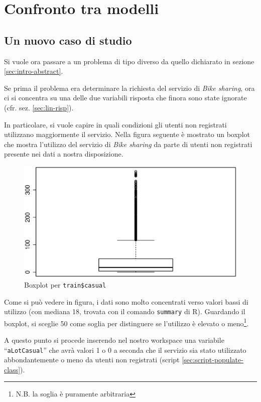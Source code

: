 \section{Confronto tra modelli}\label{sec:models-comparing}

\subsection{Un nuovo caso di studio}

Si vuole ora passare a un problema di tipo diverso da quello dichiarato in
sezione \ref{sec:intro-abstract}.

Se prima il problema era determinare la richiesta del servizio di \emph{Bike
sharing}, ora ci si concentra su una delle due variabili risposta che finora
sono state ignorate (cfr. sez. \ref{sec:lin-risp}).

In particolare, si vuole capire in quali condizioni gli utenti non registrati
utilizzano maggiormente il servizio. Nella figura seguente è mostrato un
boxplot che mostra l'utilizzo del servizio di \emph{Bike sharing} da parte di
utenti non registrati presente nei dati a nostra disposizione.

\begin{figure}[H]
  \centering
  \includegraphics[width=.5\columnwidth]{images/class/boxplot-casual.eps}
  \caption{Boxplot per \texttt{train\$casual}}
  \label{fig:simplest-linear-model}
\end{figure}

Come si può vedere in figura, i dati sono molto concentrati verso valori bassi
di utilizzo (con mediana 18, trovata con il comando \texttt{summary} di R).
Guardando il boxplot, si sceglie 50 come soglia per distinguere se l'utilizzo
è elevato o meno\footnote{N.B. la soglia è puramente arbitraria}.

A questo punto si procede inserendo nel nostro workspace una variabile
``\texttt{aLotCasual}'' che avrà valori 1 o 0 a seconda che il servizio sia
stato utilizzato abbondantemente o meno da utenti non registrati (script
\ref{sec:script-populate-class}).


